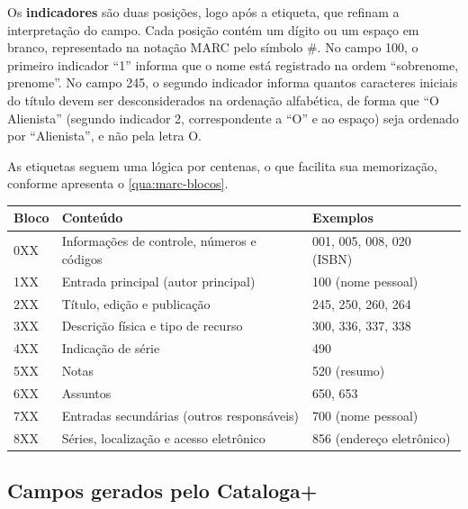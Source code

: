 Os \textbf{indicadores} são duas posições, logo após a etiqueta, que refinam a interpretação do campo. Cada posição contém um dígito ou um espaço em branco, representado na notação MARC pelo símbolo \#. No campo 100, o primeiro indicador ``1'' informa que o nome está registrado na ordem ``sobrenome, prenome''. No campo 245, o segundo indicador informa quantos caracteres iniciais do título devem ser desconsiderados na ordenação alfabética, de forma que ``O Alienista'' (segundo indicador 2, correspondente a ``O'' e ao espaço) seja ordenado por ``Alienista'', e não pela letra O.

As etiquetas seguem uma lógica por centenas, o que facilita sua memorização, conforme apresenta o \autoref{qua:marc-blocos}.

\begin{quadro}[htb]
    \centering
    \caption{Blocos de etiquetas do MARC 21 para dados bibliográficos}
    \label{qua:marc-blocos}
    \footnotesize
    \begin{tabular}{|p{}|p{}|p{}|}
        \hline
        \textbf{Bloco} & \textbf{Conteúdo} & \textbf{Exemplos} \\ \hline
        0XX & Informações de controle, números e códigos & 001, 005, 008, 020 (ISBN) \\ \hline
        1XX & Entrada principal (autor principal) & 100 (nome pessoal) \\ \hline
        2XX & Título, edição e publicação & 245, 250, 260, 264 \\ \hline
        3XX & Descrição física e tipo de recurso & 300, 336, 337, 338 \\ \hline
        4XX & Indicação de série & 490 \\ \hline
        5XX & Notas & 520 (resumo) \\ \hline
        6XX & Assuntos & 650, 653 \\ \hline
        7XX & Entradas secundárias (outros responsáveis) & 700 (nome pessoal) \\ \hline
        8XX & Séries, localização e acesso eletrônico & 856 (endereço eletrônico) \\ \hline
    \end{tabular}
\end{quadro}

\subsection{Campos gerados pelo Cataloga+}
\label{subsec:marc-campos}

